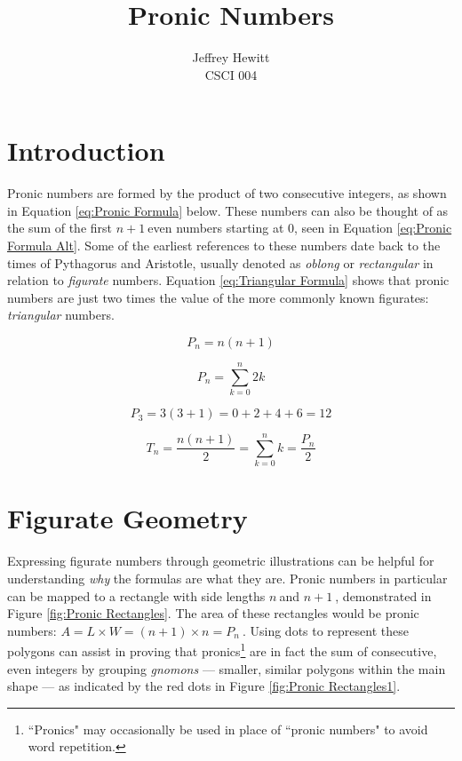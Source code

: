 \documentclass[12]{article}
\begin{document}
\title{Pronic Numbers}
\author{Jeffrey Hewitt\\ CSCI 004}
\maketitle

\section{Introduction}

Pronic numbers are formed by the product of two consecutive integers, as shown in Equation \ref{eq:Pronic Formula} below. These numbers can also be thought of as the sum of the first $ n+1\ $even numbers starting at 0, seen in Equation \ref{eq:Pronic Formula Alt}. Some of the earliest references to these numbers date back to the times of Pythagorus and Aristotle, usually denoted as \textit{oblong} or \textit{rectangular} in relation to \textit{figurate} numbers. Equation \ref{eq:Triangular Formula} shows that pronic numbers are just two times the value of the more commonly known figurates: \textit{triangular} numbers.

\begin{equation}
	P_{n} = n(n+1) \label{eq:Pronic Formula}
\end{equation}

\begin{equation}
	P_{n} = \sum_{k = 0}^{n}2k \label{eq:Pronic Formula Alt}
\end{equation}

\begin{equation}
	P_{3} = 3(3 + 1) = 0 + 2 + 4 + 6 = 12 \label{eq:Pronic Formula Example}
\end{equation}

\begin{equation}
	T_{n} = \frac{n(n+1)}{2} = \sum_{k = 0}^{n}k = \frac{P_{n}}{2} \label{eq:Triangular Formula}
\end{equation}

\section{Figurate Geometry} \label{sec:Figurate Geometry}

Expressing figurate numbers through geometric illustrations can be helpful for understanding \textit{why} the formulas are what they are. Pronic numbers in particular can be mapped to a rectangle with side lengths $ n\ $and $ n+1\ $, demonstrated in Figure \ref{fig:Pronic Rectangles}. The area of these rectangles would be pronic numbers: $ A = L \times W = (n+1) \times n = P_{n} \ $. Using dots to represent these polygons can assist in proving that pronics\footnote{``Pronics" may occasionally be used in place of ``pronic numbers" to avoid word repetition.} are in fact the sum of consecutive, even integers by grouping \textit{gnomons} — smaller, similar polygons within the main shape — as indicated by the red dots in Figure \ref{fig:Pronic Rectangles1}.
\end{document}
